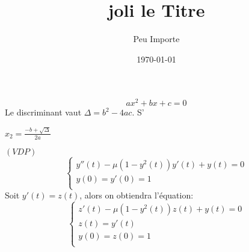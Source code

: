 \documentclass[12pt,two column]{article}
\begin{document}
\title{joli le Titre}
\author{Peu Importe}
\date{\today}
\maketitle
{}


\begin{equation}
ax^2+bx+c=0
\end{equation}
Le discriminant vaut $\Delta=b^2-4ac$. S’

$x_2=\frac{-b+\sqrt\Delta}{2a}$

$(VDP)$
\[
\left\{
\begin{array}{ll}
y''(t)-\mu(1-y^{2}(t))y'(t)+y(t)=0\\
y(0)=y'(0)=1\\
\end{array}
\right.
\]
Soit $y'(t)=z(t)$, alors on obtiendra l'équation:
\[
\left\{
\begin{array}{ll}
z'(t)-\mu(1-y^{2}(t))z(t)+y(t)=0\\
z(t)=y'(t)\\
y(0)=z(0)=1\\
\end{array}
\right.
\]
\end{document}
